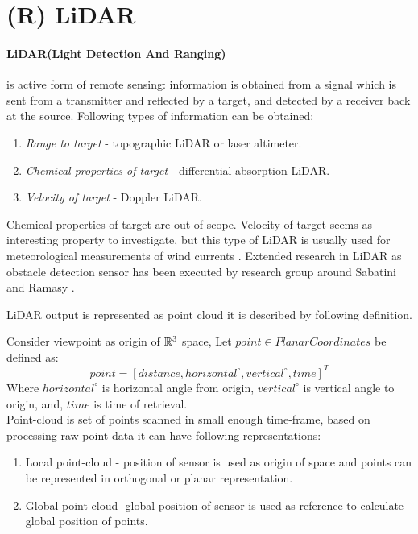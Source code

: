 \section{(R) LiDAR}\label{sec:LiDARStateOfArt}
\noindent \paragraph{LiDAR(Light Detection And Ranging)} is active form of remote sensing: information is obtained from a signal which is sent from a transmitter and reflected by a target, and detected by a receiver back at the source. Following types of information can be obtained:
\begin{enumerate}
\item \textit{Range to target} - topographic LiDAR or laser altimeter.
\item \textit{Chemical properties of target} - differential absorption LiDAR.
\item \textit{Velocity of target} - Doppler LiDAR.
\end{enumerate}

\noindent Chemical properties of target are out of scope. Velocity of  target seems as interesting property to investigate, but this type of LiDAR is usually used for meteorological measurements of wind currents \cite{martin2011meteorological}. Extended research in LiDAR as obstacle detection sensor has been executed by research group around Sabatini \cite{sabatini2014lidar} and Ramasy \cite{ramasamy2016lidar}. 

LiDAR output is represented as point cloud it is described by following definition.
\begin{definition}
Consider viewpoint as origin of $\mathbb{R}^3$ space,  Let  $point \in Planar Coordinates$ be defined as:
    \begin{equation}
        point = [ distance, horizontal^\circ, vertical^\circ, time ]^T
    \end{equation}
    Where $horizontal^\circ$ is horizontal angle from origin, $vertical^\circ$ is vertical angle to origin, and, $time$ is time of retrieval.\\

    \noindent Point-cloud is set of points scanned in small enough time-frame, based on processing raw point data it can have following representations:
    
    \begin{enumerate}
        \item Local point-cloud - position of sensor is used as origin of space and points can be represented in orthogonal or planar representation. 
        
        \item Global point-cloud -global position of sensor is used as reference to calculate global position of points.
    \end{enumerate}
\end{definition}

